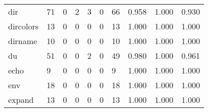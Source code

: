 \begin{longtable}{lp{2.0cm}p{2.0cm}p{2.0cm}p{2.0cm}p{2.0cm}p{2.0cm}p{2.0cm}p{2.0cm}p{2.0cm}}
dir       &                     71 &                                             0 &                                            2 &                                           3 &                                            0 &                                         66 &                                0.958 &                                  1.000 &                                0.930 \\
dircolors &                     13 &                                             0 &                                            0 &                                           0 &                                            0 &                                         13 &                                1.000 &                                  1.000 &                                1.000 \\
dirname   &                     10 &                                             0 &                                            0 &                                           0 &                                            0 &                                         10 &                                1.000 &                                  1.000 &                                1.000 \\
du        &                     51 &                                             0 &                                            0 &                                           2 &                                            0 &                                         49 &                                0.980 &                                  1.000 &                                0.961 \\
echo      &                      9 &                                             0 &                                            0 &                                           0 &                                            0 &                                          9 &                                1.000 &                                  1.000 &                                1.000 \\
env       &                     18 &                                             0 &                                            0 &                                           0 &                                            0 &                                         18 &                                1.000 &                                  1.000 &                                1.000 \\
expand    &                     13 &                                             0 &                                            0 &                                           0 &                                            0 &                                         13 &                                1.000 &                                  1.000 &                                1.000 \\

\end{longtable}
